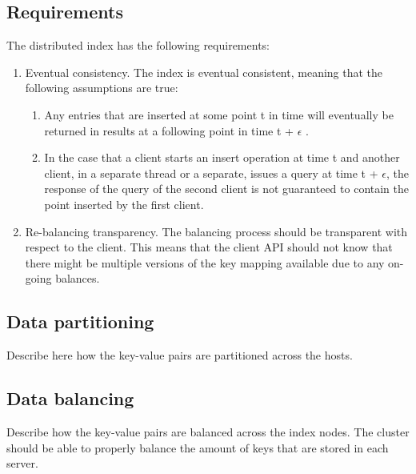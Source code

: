 \documentclass[11pt,a4paper]{globis-book}
\begin{document}
\subsection{Requirements}
The distributed index has the following requirements:
\begin{enumerate}
    \item Eventual consistency. The index is eventual consistent, meaning that the following assumptions are true:
        \begin{enumerate}
            \item Any entries that are inserted at some point t in time will eventually be returned in results at a following point in time t + $\epsilon$ .
            \item In the case that a client starts an insert operation at time t and another client, in a separate thread or a separate, issues a query at time t + $\epsilon$, the response of the query of the second client is not guaranteed to contain the point inserted by the first client.
        \end{enumerate} 
    \item Re-balancing transparency. The balancing process should be transparent with respect to the client. This means that the client API should not know that there might be multiple versions of the key mapping available due to any on-going balances. 
\end{enumerate} 

\subsection{Data partitioning}

Describe here how the key-value pairs are partitioned across the hosts.
\subsection{Data balancing}

Describe how the key-value pairs are balanced across the index nodes.
The cluster should be able to properly balance the amount of keys that are stored in each server.
\end{document}
